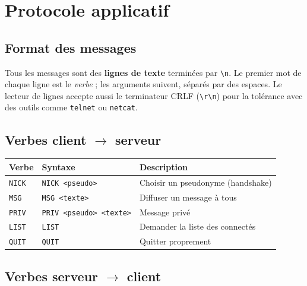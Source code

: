 \documentclass[12pt,a4paper]{article}
\begin{document}
\section{Protocole applicatif}

\subsection{Format des messages}

Tous les messages sont des \textbf{lignes de texte} terminées par
\texttt{\textbackslash n}. Le premier mot de chaque ligne est le
\emph{verbe} ; les arguments suivent, séparés par des espaces. Le lecteur de
lignes accepte aussi le terminateur CRLF (\texttt{\textbackslash r\textbackslash n})
pour la tolérance avec des outils comme \texttt{telnet} ou \texttt{netcat}.

\subsection{Verbes client $\to$ serveur}

\begin{center}
\begin{tabular}{@{}lll@{}}
\toprule
Verbe & Syntaxe & Description \\
\midrule
\texttt{NICK} & \texttt{NICK <pseudo>} & Choisir un pseudonyme (handshake) \\
\texttt{MSG}  & \texttt{MSG <texte>}   & Diffuser un message à tous \\
\texttt{PRIV} & \texttt{PRIV <pseudo> <texte>} & Message privé \\
\texttt{LIST} & \texttt{LIST}          & Demander la liste des connectés \\
\texttt{QUIT} & \texttt{QUIT}          & Quitter proprement \\
\bottomrule
\end{tabular}
\end{center}

\subsection{Verbes serveur $\to$ client}
\end{document}
